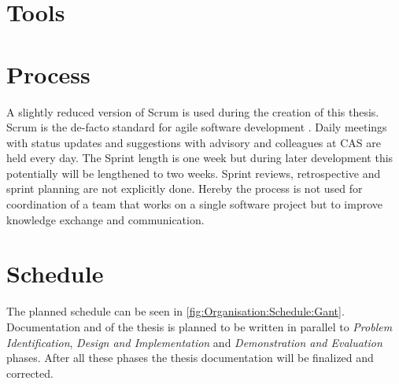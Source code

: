 \section{Tools}
\label{sec:Organisation:Tools}


\section{Process}
\label{sec:Organisation:Process}

A slightly reduced version of Scrum is used during the creation of this thesis. Scrum is the de-facto standard for agile software development \cite{glogerScrumPradigmenwechselIm2010}. Daily meetings with status updates and suggestions with advisory and colleagues at CAS are held every day. The Sprint length is one week but during later development this potentially will be lengthened to two weeks. Sprint reviews, retrospective and sprint planning are not explicitly done. Hereby the process is not used for coordination of a team that works on a single software project but to improve knowledge exchange and communication.

\section{Schedule}
\label{sec:Organisation:Schedule}

The planned schedule can be seen in \ref{fig:Organisation:Schedule:Gant}. Documentation and of the thesis is planned to be written in parallel to  \emph{Problem Identification}, \emph{Design and Implementation} and \emph{Demonstration and Evaluation} phases. After all these phases the thesis documentation will be finalized and corrected. 

